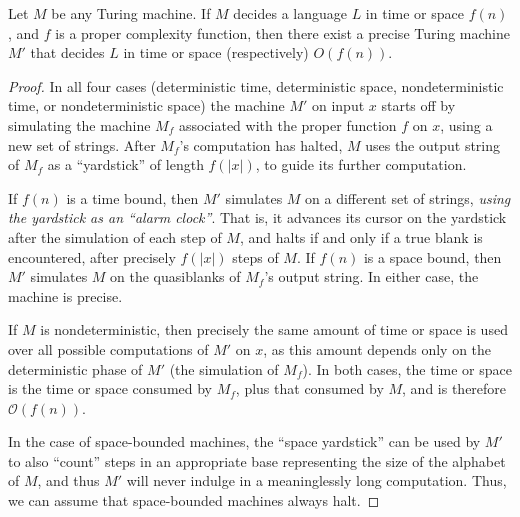 \documentclass[12pt]{article}
\begin{document}
\begin{defbox}
  Let $M$ be any Turing machine. If $M$ decides a language $L$ in time or space $f(n)$, and $f$ is a proper complexity function, then there exist a precise Turing machine $M'$ that decides $L$ in time or space (respectively) $O(f(n))$.
\end{defbox}
\begin{proof}
  In all four cases (deterministic time, deterministic space, nondeterministic time, or nondeterministic space) the machine $M'$ on input $x$ starts off by simulating the machine $M_f$ associated with the proper function $f$ on $x$, using a new set of strings. After $M_f$'s computation has halted, $M$ uses the output string of $M_f$ as a ``yardstick'' of length $f(|x|)$, to guide its further computation. 

If $f(n)$ is a time bound, then $M'$ simulates $M$ on a different set of strings, \textit{using the yardstick as an ``alarm clock''}. That is, it advances its cursor on the yardstick after the simulation of each step of $M$, and halts if and only if a true blank is encountered, after precisely $f(|x|)$ steps of $M$. If $f(n)$ is a space bound, then $M'$ simulates $M$ on the quasiblanks of $M_f$'s output string. In either case, the machine is precise. 

If $M$ is nondeterministic, then precisely the same amount of time or space is used over all possible computations of $M'$ on $x$, as this amount depends only on the deterministic phase of $M'$ (the simulation of $M_f$). In both cases, the time or space is the time or space consumed by $M_f$, plus that consumed by $M$, and is therefore $\mathcal{O}(f(n))$.

In the case of space-bounded machines, the ``space yardstick'' can be used by $M'$ to also ``count'' steps in an appropriate base representing the size of the alphabet of $M$, and thus $M'$ will never indulge in a meaninglessly long computation. Thus, we can assume that space-bounded machines always halt.
\end{proof}
\end{document}

